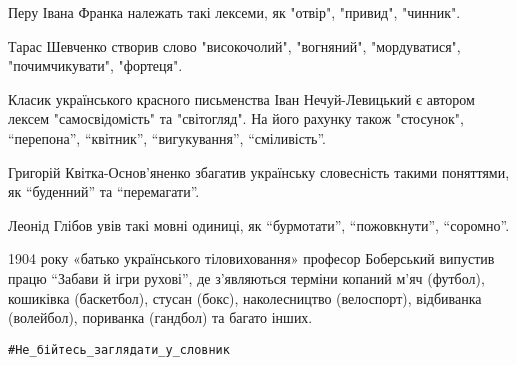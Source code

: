 Перу Івана Франка належать такі лексеми, як "отвір", "привид", "чинник".

Тарас Шевченко створив слово "високочолий",  "вогняний", "мордуватися",
"почимчикувати", "фортеця".

Класик українського красного письменства Іван Нечуй-Левицький є автором лексем
"самосвідомість" та "світогляд". На його рахунку також "стосунок", “перепона”,
“квітник”, “вигукування”, “сміливість”.

Григорій Квітка-Основ’яненко збагатив українську словесність такими поняттями,
як “буденний” та “перемагати”.

Леонід Глібов увів такі мовні одиниці, як “бурмотати”, “пожовкнути”, “соромно”.

1904 року «батько українського тіловиховання» професор Боберський випустив
працю \enquote{Забави й ігри рухові}, де з’являються терміни копаний м’яч (футбол),
кошиківка (баскетбол), стусан (бокс), наколесництво (велоспорт), відбиванка
(волейбол), пориванка (гандбол) та багато інших.

\verb|#Не_бійтесь_заглядати_у_словник|

